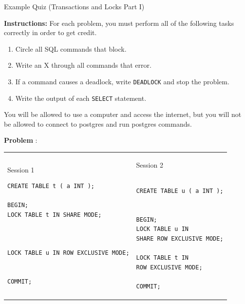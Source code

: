 \documentclass[10pt]{article}
\theoremstyle{definition}
\newcounter{ProblemCounter}
\newcommand{\nextproblem}{\filbreak\stepcounter{ProblemCounter} \noindent\textbf{Problem \theProblemCounter}:}
\begin{document}
\begin{center}
{
\Large
    Example Quiz (Transactions and Locks Part I)
}

    \vspace{0.1in}
\end{center}

\noindent
\textbf{Instructions:}
For each problem, you must perform all of the following tasks correctly in order to get credit.
\begin{enumerate}
\item Circle all SQL commands that block.
\item Write an X through all commands that error.
\item If a command causes a deadlock, write \lstinline{DEADLOCK} and stop the problem.
\item Write the output of each \lstinline{SELECT} statement.
\end{enumerate}
    You will be allowed to use a computer and access the internet, but you will not be allowed to connect to postgres and run postgres commands.

\vspace{1in}

\nextproblem
\begin{tcolorbox}
\begin{tabular}{p{3.25in}p{3in}}
\hspace{-0.2in}Session 1
\begin{lstlisting}
CREATE TABLE t ( a INT );

BEGIN;
LOCK TABLE t IN SHARE MODE;
  


LOCK TABLE u IN ROW EXCLUSIVE MODE;


COMMIT;
\end{lstlisting}
    &
\hspace{-0.2in}Session 2
\begin{lstlisting}

CREATE TABLE u ( a INT );


BEGIN;
LOCK TABLE u IN
SHARE ROW EXCLUSIVE MODE;

LOCK TABLE t IN
ROW EXCLUSIVE MODE;

COMMIT;

\end{lstlisting}
\end{tabular}
\end{tcolorbox}
\vspace{0.25in}
\end{document}
